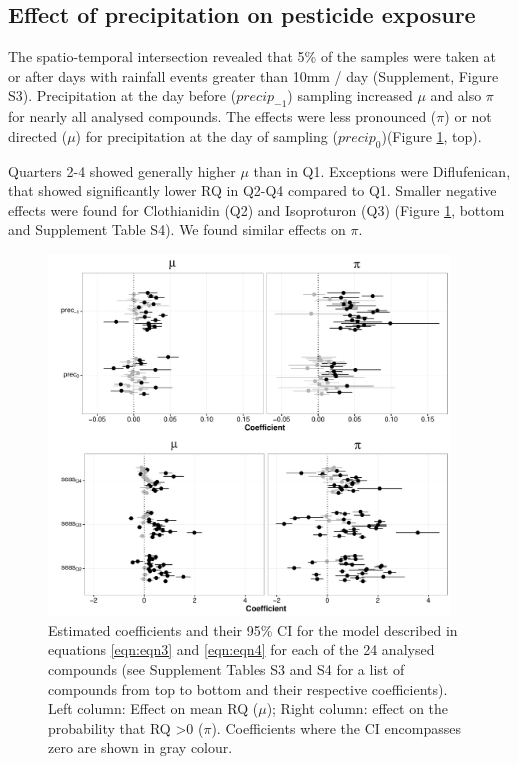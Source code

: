 \documentclass[journal=esthag,manuscript=article]{achemso}
\begin{document}
\subsection{Effect of precipitation on pesticide exposure}
The spatio-temporal intersection revealed that 5\% of the samples were taken at or after days with rainfall events greater than 10mm / day (Supplement, Figure S3).
Precipitation at the day before ($precip_{-1}$) sampling increased $\mu$ and also $\pi$ for nearly all analysed compounds. 
The effects were less pronounced ($\pi$) or not directed ($\mu$) for precipitation at the day of sampling ($precip_{0}$)(Figure \ref{fig:fig5}, top).

Quarters 2-4 showed generally higher $\mu$ than in Q1. 
Exceptions were Diflufenican, that showed significantly lower RQ in Q2-Q4 compared to Q1.
Smaller negative effects were found for Clothianidin (Q2) and Isoproturon (Q3) (Figure \ref{fig:fig5}, bottom and Supplement Table S4).
We found similar effects on $\pi$. 

\begin{figure}[h]
  \includegraphics[width=0.95\textwidth]{figure5.pdf}
  \caption{Estimated coefficients and their 95\% CI for the model described in equations \ref{eqn:eqn3} and \ref{eqn:eqn4} for each of the 24 analysed compounds (see Supplement Tables S3 and S4 for a list of compounds from top to bottom and their respective coefficients). Left column: Effect on mean RQ ($\mu$); Right column: effect on the probability that RQ \textgreater 0 ($\pi$).
  Coefficients where the CI encompasses zero are shown in gray colour.
  }
  \label{fig:fig5}
\end{figure}
\end{document}
